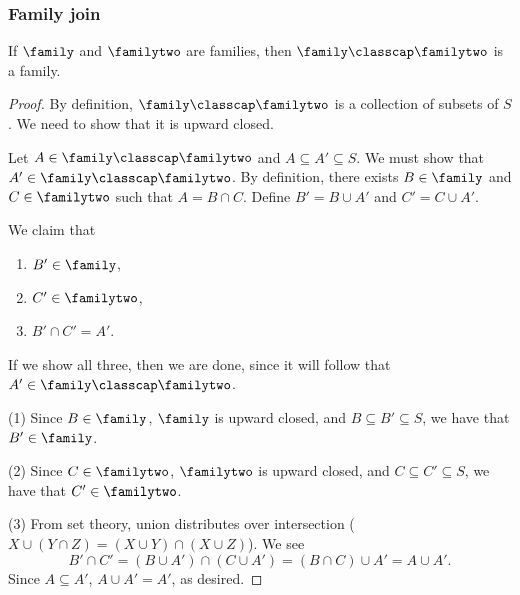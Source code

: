 \subsubsection{Family join}

\begin{theorem}
\label{thm_family_classcap_is_family}
    If $\family$ and $\familytwo$ are families, then $\family \classcap \familytwo$ is a family.
\end{theorem}

\begin{proof}
     By definition, $\family \classcap \familytwo$ is a collection of subsets of $S$.  We need to show that it is upward closed.


    Let $A \in \family \classcap \familytwo$ and $A \subseteq A' \subseteq S$.  We must show that $A' \in \family \classcap \familytwo$.  By definition, there exists $B \in \family$ and $C \in \familytwo$ such that $A = B \cap C$.  Define $B' = B \cup A'$ and $C' = C \cup A'$.

    We claim that
    \begin{enumerate}
        \item $B' \in \family$,
        \item $C' \in \familytwo$,
        \item $B' \cap C' = A'$.
    \end{enumerate}
    If we show all three, then we are done, since it will follow that $A' \in \family \classcap \familytwo$.
    
    (1) Since $B \in \family$, $\family$ is upward closed, and $B \subseteq B' \subseteq S$, we have that $B' \in \family$.

    (2) Since $C \in \familytwo$, $\familytwo$ is upward closed, and $C \subseteq C' \subseteq S$, we have that $C' \in \familytwo$.

    (3) From set theory, union distributes over intersection ($X \cup (Y \cap Z) = (X \cup Y) \cap (X \cup Z)$).  We see
    \[B' \cap C' = (B \cup A') \cap (C \cup A') = (B \cap C) \cup A' = A \cup A'.\]
    Since $A \subseteq A'$, $A \cup A' = A'$, as desired.
\end{proof}

